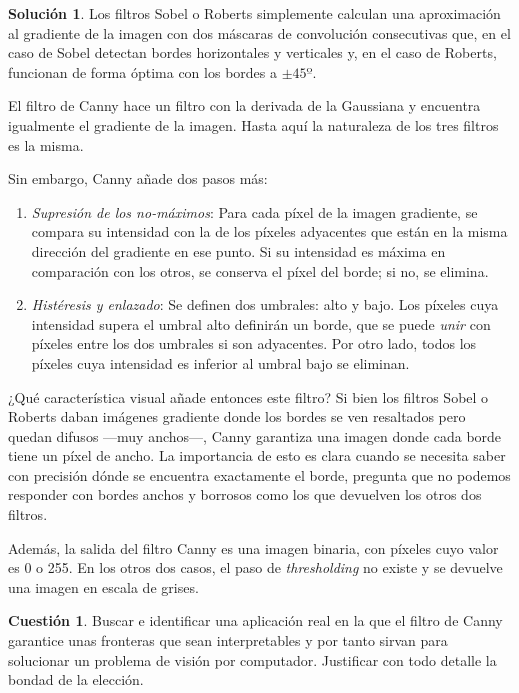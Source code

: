 \documentclass[a4paper, 11pt]{article}
\theoremstyle{definition}
\newtheorem*{solucion}{Solución}
\theoremstyle{theorem}
\newtheorem{cuestion}{Cuestión}
\begin{document}
  \begin{solucion}
      Los filtros Sobel o Roberts simplemente calculan una aproximación al gradiente de la imagen con dos máscaras de convolución consecutivas que, en el caso de Sobel detectan bordes horizontales y verticales y, en el caso de Roberts, funcionan de forma óptima con los bordes a $\pm45º$.

      El filtro de Canny hace un filtro con la derivada de la Gaussiana y encuentra igualmente el gradiente de la imagen. Hasta aquí la naturaleza de los tres filtros es la misma.

      Sin embargo, Canny añade dos pasos más:
      \begin{enumerate}
          \item \emph{Supresión de los no-máximos}: Para cada píxel de la imagen gradiente, se compara su intensidad con la de los píxeles adyacentes que están en la misma dirección del gradiente en ese punto. Si su intensidad es máxima en comparación con los otros, se conserva el píxel del borde; si no, se elimina.
          \item \emph{Histéresis y enlazado}: Se definen dos umbrales: alto y bajo. Los píxeles cuya intensidad supera el umbral alto definirán un borde, que se puede \emph{unir} con píxeles entre los dos umbrales si son adyacentes. Por otro lado, todos los píxeles cuya intensidad es inferior al umbral bajo se eliminan.
      \end{enumerate}

      ¿Qué característica visual añade entonces este filtro? Si bien los filtros Sobel o Roberts daban imágenes gradiente donde los bordes se ven resaltados pero quedan difusos ---muy anchos---, Canny garantiza una imagen donde cada borde tiene un píxel de ancho. La importancia de esto es clara cuando se necesita saber con precisión dónde se encuentra exactamente el borde, pregunta que no podemos responder con bordes anchos y borrosos como los que devuelven los otros dos filtros.

      Además, la salida del filtro Canny es una imagen binaria, con píxeles cuyo valor es 0 o 255. En los otros dos casos, el paso de \emph{thresholding} no existe y se devuelve una imagen en escala de grises.
  \end{solucion}

  \begin{cuestion}
      Buscar e identificar una aplicación real en la que el filtro de Canny garantice unas fronteras que sean interpretables y por tanto sirvan para solucionar un problema de visión por computador. Justificar con todo detalle la bondad de la elección.
  \end{cuestion}
\end{document}
